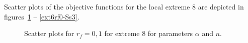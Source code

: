 \documentclass[review]{elsarticle}
\begin{document}
Scatter plots of the objective functions for the local extreme 8 are depicted in figures~\ref{ext6rf0-an3} -- \ref{ext6rf0-Ss3}.

\begin{figure}[htb!]
\label{ext6rf0-an3}
\caption{Scatter plots for $r_f=0,1$ for extreme 8 for parameters $\alpha$ and $n$.}
\end{figure}
\end{document}
